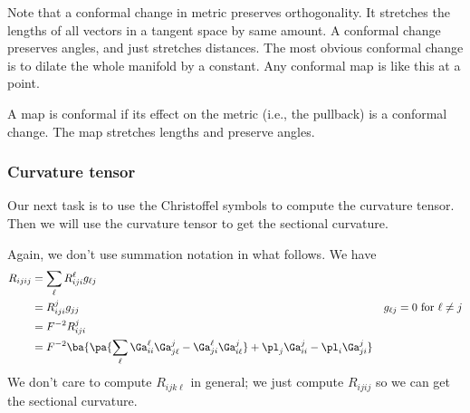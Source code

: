 Note that a conformal change in metric preserves orthogonality. It stretches the lengths of all vectors in a tangent space by same amount. A conformal change preserves angles, and just stretches distances. The most obvious conformal change is to dilate the whole manifold by a constant. Any conformal map is like this at a point.

A map is conformal if its effect on the metric (i.e., the pullback) is a conformal change. The map stretches lengths and preserve angles.
\subsubsection{Curvature tensor}
Our next task is to use the Christoffel symbols to compute the curvature tensor. Then we will use the curvature tensor to get the sectional curvature.

Again, we don't use summation notation in what follows.
We have 
\begin{align*}
R_{ijij}&=\sum_{\ell} R_{iji}^{\ell} g_{\ell j}\\
&= R_{iji}^j g_{jj}&g_{\ell j}=0\text{ for }\ell\ne j\\
&= F^{-2} R_{iji}^j\\
&= F^{-2}\ba{\pa{
\sum_{\ell} \Ga_{ii}^{\ell} \Ga_{j\ell}^j -\Ga_{ji}^{\ell}\Ga_{i\ell}^j} + \pl_j \Ga_{ii}^j -\pl_i \Ga_{ji}^j
}
\end{align*}
We don't care to compute $R_{ijk\ell}$ in general; we just compute $R_{ijij}$ so we can get the sectional curvature. %

